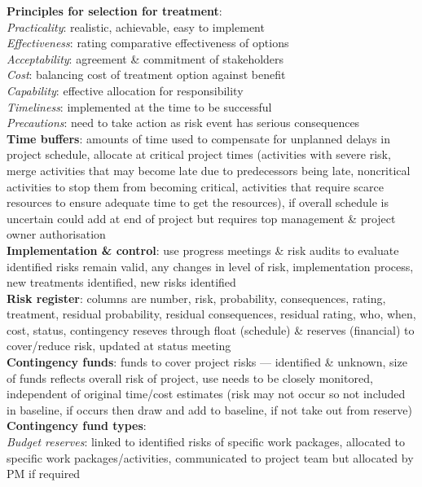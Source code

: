 \documentclass[a4paper]{article}
\begin{document}
\begin{multicols}{3}
        \textbf{Principles for selection for treatment}:\\
        \textit{Practicality}: realistic, achievable, easy to implement\\
        \textit{Effectiveness}: rating comparative effectiveness of options\\
        \textit{Acceptability}: agreement \& commitment of stakeholders\\
        \textit{Cost}: balancing cost of treatment option against benefit\\
        \textit{Capability}: effective allocation for responsibility\\
        \textit{Timeliness}: implemented at the time to be successful\\
        \textit{Precautions}: need to take action as risk event has serious consequences\\
        \textbf{Time buffers}: amounts of time used to compensate for unplanned delays in project schedule, allocate at critical project times (activities with severe risk, merge activities that may become late due to predecessors being late, noncritical activities to stop them from becoming critical, activities that require scarce resources to ensure adequate time to get the resources), if overall schedule is uncertain could add at end of project but requires top management \& project owner authorisation\\
        \textbf{Implementation \& control}: use progress meetings \& risk audits to evaluate identified risks remain valid, any changes in level of risk, implementation process, new treatments identified, new risks identified\\
        \textbf{Risk register}: columns are number, risk, probability, consequences, rating, treatment, residual probability, residual consequences, residual rating, who, when, cost, status, contingency reseves through float (schedule) \& reserves (financial) to cover/reduce risk, updated at status meeting\\
        \textbf{Contingency funds}: funds to cover project risks --- identified \& unknown, size of funds reflects overall risk of project, use needs to be closely monitored, independent of original time/cost estimates (risk may not occur so not included in baseline, if occurs then draw and add to baseline, if not take out from reserve)\\
        \textbf{Contingency fund types}:\\
        \textit{Budget reserves}: linked to identified risks of specific work packages, allocated to specific work packages/activities, communicated to project team but allocated by PM if required\\

\end{multicols}
\end{document}

